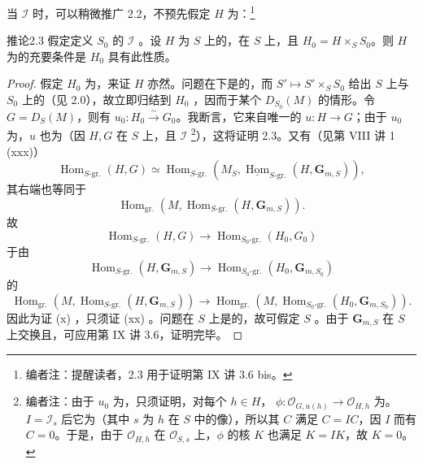 当 $\mathscr I$ 时，可以稍微推广 2.2，不预先假定 $H$ 为：\footnote[8]{编者注：提醒读者，2.3 用于证明第 IX 讲 3.6 bis。}
\begin{SGAresult}{推论}{2.3}
假定定义 $S_0$ 的 $\mathscr I$ 。设 $H$ 为 $S$ 上的，在 $S$ 上，且 $H_0=H\times_S S_0$。则 $H$ 为的充要条件是 $H_0$ 具有此性质。
\end{SGAresult}
\begin{proof}
假定 $H_0$ 为，来证 $H$ 亦然。问题在下是的，而 $S'\mapsto S'\times_S S_0$ 给出 $S$ 上与 $S_0$ 上的（见 2.0），故立即归结到 $H_0$ ，因而于某个 $D_{S_0}(M)$ 的情形。令 $G=D_S(M)$，则有 $u_0:H_0\xrightarrow{\sim}G_0$。我断言，它来自唯一的 $u:H\to G$；由于 $u_0$ 为，$u$ 也为（因 $H,G$ 在 $S$ 上，且 $\mathscr I$ \footnote[9]{编者注：由于 $u_0$ 为，只须证明，对每个 $h\in H$， $\phi:\mathscr O_{G,u(h)}\to\mathscr O_{H,h}$ 为。 $I=\mathscr I_s$ 后它为（其中 $s$ 为 $h$ 在 $S$ 中的像），所以其 $C$ 满足 $C=IC$，因 $I$ 而有 $C=0$。于是，由于 $\mathscr O_{H,h}$ 在 $\mathscr O_{S,s}$ 上，$\phi$ 的核 $K$ 也满足 $K=IK$，故 $K=0$。}），这将证明 2.3。又有（见第 VIII 讲 1 (xxx)）
\[
\operatorname{Hom}_{S\text{-gr.}}(H,G)\simeq
\operatorname{Hom}_{S\text{-gr.}}(M_S,\underline{\operatorname{Hom}}_{S\text{-gr.}}(H,\mathbf G_{m,S})),
\]
其右端也等同于
\[
\operatorname{Hom}_{\mathrm{gr.}}(M,\operatorname{Hom}_{S\text{-gr.}}(H,\mathbf G_{m,S})).
\]
故
\[
\operatorname{Hom}_{S\text{-gr.}}(H,G)\longrightarrow\operatorname{Hom}_{S_0\text{-gr.}}(H_0,G_0)\tag{x}
\]
于由
\[
\operatorname{Hom}_{S\text{-gr.}}(H,\mathbf G_{m,S})\longrightarrow
\operatorname{Hom}_{S_0\text{-gr.}}(H_0,\mathbf G_{m,S_0})\tag{xx}
\]
的
\[
\operatorname{Hom}_{\mathrm{gr.}}(M,\operatorname{Hom}_{S\text{-gr.}}(H,\mathbf G_{m,S}))
\longrightarrow
\operatorname{Hom}_{\mathrm{gr.}}(M,\operatorname{Hom}_{S_0\text{-gr.}}(H_0,\mathbf G_{m,S_0})).
\]
因此为证 (x) ，只须证 (xx) 。问题在 $S$ 上是的，故可假定 $S$ 。由于 $\mathbf G_{m,S}$ 在 $S$ 上交换且，可应用第 IX 讲 3.6，证明完毕。
\end{proof}
